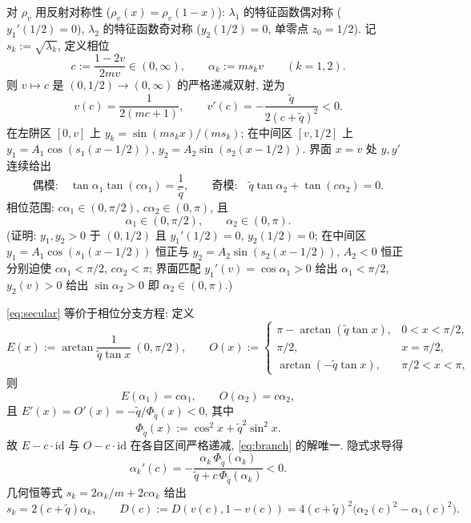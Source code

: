 \documentclass[UTF8]{ctexart}
\begin{document}
对 $\rho_v$ 用反射对称性 ($\rho_v(x)=\rho_v(1-x)$): $\lambda_1$ 的特征函数偶对称
($y_1'(1/2)=0$), $\lambda_2$ 的特征函数奇对称 ($y_2(1/2)=0$, 单零点
$z_0=1/2$). 记 $s_k:=\sqrt{\lambda_k}$, 定义相位
\begin{equation}
	c:=\frac{1-2v}{2mv}\in(0,\infty),\qquad
	\alpha_k:=ms_k v\qquad(k=1,2).
	\label{eq:defalpha}
\end{equation}
则 $v\mapsto c$ 是 $(0,1/2)\to(0,\infty)$ 的严格递减双射, 逆为
\begin{equation}
	v(c)=\frac{1}{2(mc+1)},\qquad v'(c)=-\frac{\tilde q}{2(c+\tilde q)^2}<0.
	\label{eq:vofc}
\end{equation}
在左阱区 $[0,v]$ 上 $y_k=\sin(ms_k x)/(ms_k)$; 在中间区 $[v,1/2]$ 上
$y_1=A_1\cos(s_1(x-1/2))$, $y_2=A_2\sin(s_2(x-1/2))$. 界面 $x=v$ 处 $y,y'$
连续给出
\begin{equation}
	\text{偶模:}\quad \tan\alpha_1\tan(c\alpha_1)=\frac1{\tilde q},\qquad
	\text{奇模:}\quad \tilde q\tan\alpha_2+\tan(c\alpha_2)=0.
	\label{eq:secular}
\end{equation}
相位范围: $c\alpha_1\in(0,\pi/2)$, $c\alpha_2\in(0,\pi)$, 且
\begin{equation}
	\alpha_1\in(0,\pi/2),\qquad \alpha_2\in(0,\pi).
	\label{eq:alpharange}
\end{equation}
(证明: $y_1,y_2>0$ 于 $(0,1/2)$ 且 $y_1'(1/2)=0$, $y_2(1/2)=0$; 在中间区
$y_1=A_1\cos(s_1(x-1/2))$ 恒正与 $y_2=A_2\sin(s_2(x-1/2))$, $A_2<0$ 恒正
分别迫使 $c\alpha_1<\pi/2$, $c\alpha_2<\pi$; 界面匹配 $y_1'(v)=\cos\alpha_1>0$
给出 $\alpha_1<\pi/2$, $y_2(v)>0$ 给出 $\sin\alpha_2>0$ 即 $\alpha_2\in(0,\pi)$.)

\eqref{eq:secular} 等价于相位分支方程: 定义
\begin{equation}
	E(x):=\arctan\frac{1}{\tilde q\tan x}\ (0,\pi/2),\qquad
	O(x):=
	\begin{cases}
		\pi-\arctan(\tilde q\tan x), & 0<x<\pi/2,\\
		\pi/2, & x=\pi/2,\\
		\arctan(-\tilde q\tan x), & \pi/2<x<\pi,
	\end{cases}
\end{equation}
则
\begin{equation}
	E(\alpha_1)=c\alpha_1,\qquad O(\alpha_2)=c\alpha_2,
	\label{eq:branch}
\end{equation}
且 $E'(x)=O'(x)=-\tilde q/\Phi_{\tilde q}(x)<0$, 其中
\begin{equation}
	\Phi_{\tilde q}(x):=\cos^2x+\tilde q^2\sin^2x.
\end{equation}
故 $E-c\cdot\mathrm{id}$ 与 $O-c\cdot\mathrm{id}$ 在各自区间严格递减, \eqref{eq:branch}
的解唯一. 隐式求导得
\begin{equation}
	\alpha_k'(c)=-\frac{\alpha_k\,\Phi_{\tilde q}(\alpha_k)}
	{\tilde q+c\,\Phi_{\tilde q}(\alpha_k)}<0.
	\label{eq:alphap}
\end{equation}
几何恒等式 $s_k=2\alpha_k/m+2c\alpha_k$ 给出
\begin{equation}
	s_k=2(c+\tilde q)\alpha_k,\qquad
	D(c):=D(v(c),1-v(c))=4(c+\tilde q)^2\bigl(\alpha_2(c)^2-\alpha_1(c)^2\bigr).
	\label{eq:D}
\end{equation}
\end{document}
